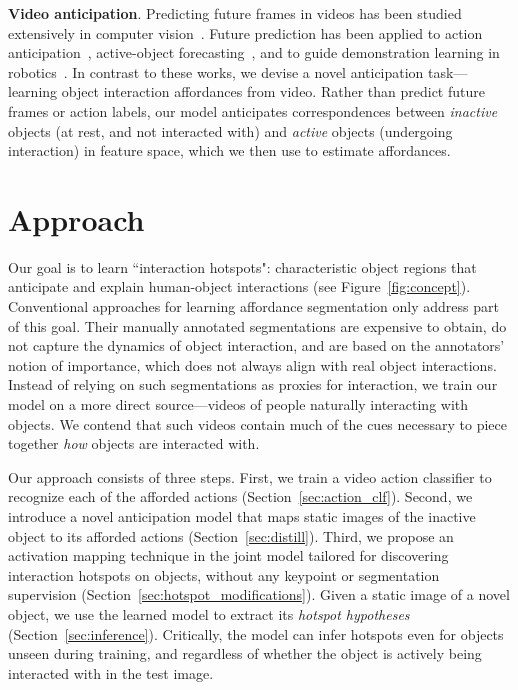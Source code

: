 \documentclass[10pt,twocolumn,letterpaper]{article}
\newcommand{\reffig}[1]{Figure~\ref{#1}}
\newcommand{\refsec}[1]{Section~\ref{#1}}
\begin{document}
\vspace{0.05in}
\noindent\textbf{Video anticipation}. 
Predicting future frames in videos has been studied extensively in computer vision~\cite{ranzato2014video,mathieu2015deep,vondrick2017generating,liang2017dual,srivastava2015unsupervised,villegas2017learning,walker2017pose,oh2015action,xue2016visual,vondrick2016generating,jayaraman2018time}. Future prediction has been applied to action anticipation~\cite{huang2014action,vondrick2015anticipating,koppula2016anticipating,rhinehart2018forecast}, active-object forecasting~\cite{furnari2017next}, and to guide demonstration learning in robotics~\cite{finn2016unsupervised,finn2017deep,ebert2017self}.
In contrast to these works, we 
devise a novel anticipation task---learning object interaction affordances from video. 
Rather than predict future frames or action labels, our model anticipates 
correspondences between \emph{inactive} objects (at rest, and not interacted with) and \emph{active} objects (undergoing interaction) in feature space, which we then use to estimate affordances.
 \section{Approach}


Our goal is to learn ``interaction hotspots": characteristic object regions that anticipate and explain human-object interactions (see \reffig{fig:concept}).  
Conventional approaches for learning affordance segmentation  only address part of this goal. Their manually annotated segmentations are expensive to obtain, do not capture the dynamics of object interaction, and are based on the annotators' notion of importance, which does not always align with real object interactions.
Instead of relying on such segmentations as proxies for interaction, we train our model on a more direct source---videos of people naturally interacting with objects. We contend that such videos contain much of the cues necessary to piece together \emph{how} objects are interacted with.



Our approach consists of three steps.  First, we train a video action classifier to recognize each of the afforded actions (\refsec{sec:action_clf}).
Second, we introduce a novel anticipation model that maps static images of the inactive object to its afforded actions (\refsec{sec:distill}).
Third, we propose an activation mapping technique in the joint model tailored for discovering interaction hotspots on objects, without any keypoint or segmentation supervision (\refsec{sec:hotspot_modifications}).
Given a static image of a novel object, we use the learned model to extract its \emph{hotspot hypotheses} (\refsec{sec:inference}). Critically, the model can infer hotspots even for objects unseen during training, and regardless of whether the object is actively being interacted with in the test image. 
\end{document}
